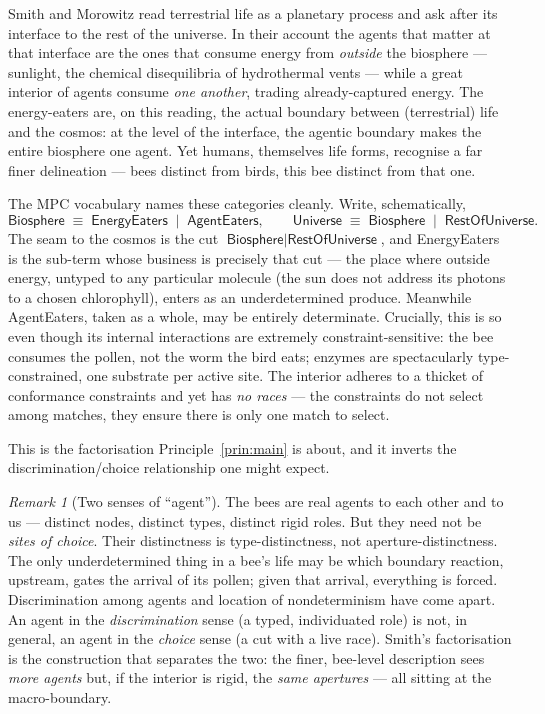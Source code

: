 \documentclass[11pt]{article}
\theoremstyle{definition}
\theoremstyle{plain}
\theoremstyle{remark}
\newtheorem{remark}{Remark}
\newcommand{\rcong}{\equiv}
\newcommand{\Cut}{\mid}
\begin{document}
Smith and Morowitz \cite{smith} read terrestrial life as a planetary process and
ask after its interface to the rest of the universe. In their account the agents
that matter at that interface are the ones that consume energy from \emph{outside}
the biosphere --- sunlight, the chemical disequilibria of hydrothermal vents ---
while a great interior of agents consume \emph{one another}, trading already-captured
energy. The energy-eaters are, on this reading, the actual boundary between
(terrestrial) life and the cosmos: at the level of the interface, the agentic
boundary makes the entire biosphere one agent. Yet humans, themselves life forms,
recognise a far finer delineation --- bees distinct from birds, this bee distinct
from that one.

The MPC vocabulary names these categories cleanly. Write, schematically,
\[
\textsf{Biosphere}
\;\rcong\;
\textsf{EnergyEaters} \;\Cut\; \textsf{AgentEaters},
\qquad
\textsf{Universe}
\;\rcong\;
\textsf{Biosphere} \;\Cut\; \textsf{RestOfUniverse}.
\]
The seam to the cosmos is the cut $\textsf{Biosphere} \Cut
\textsf{RestOfUniverse}$, and \textsf{EnergyEaters} is the sub-term whose
business is precisely that cut --- the place where outside energy, untyped to any
particular molecule (the sun does not address its photons to a chosen chlorophyll),
enters as an underdetermined produce. Meanwhile \textsf{AgentEaters}, taken as a
whole, may be entirely determinate. Crucially, this is so even though its internal
interactions are extremely constraint-sensitive: the bee consumes the pollen, not
the worm the bird eats; enzymes are spectacularly type-constrained, one substrate
per active site. The interior adheres to a thicket of conformance constraints and
yet has \emph{no races} --- the constraints do not select among matches, they
ensure there is only one match to select.

This is the factorisation Principle~\ref{prin:main} is about, and it inverts the
discrimination/choice relationship one might expect.

\begin{remark}[Two senses of ``agent'']\label{rmk:twoagents}
The bees are real agents to each other and to us --- distinct nodes, distinct
types, distinct rigid roles. But they need not be \emph{sites of choice}. Their
distinctness is type-distinctness, not aperture-distinctness. The only
underdetermined thing in a bee's life may be which boundary reaction, upstream,
gates the arrival of its pollen; given that arrival, everything is forced.
Discrimination among agents and location of nondeterminism have come apart. An
agent in the \emph{discrimination} sense (a typed, individuated role) is not, in
general, an agent in the \emph{choice} sense (a cut with a live race). Smith's
factorisation is the construction that separates the two: the finer, bee-level
description sees \emph{more agents} but, if the interior is rigid, the \emph{same
apertures} --- all sitting at the macro-boundary.
\end{remark}
\end{document}
